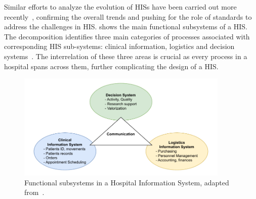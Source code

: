 Similar efforts to analyze the evolution of \acp{HIS} have been carried out more recently~\cite{Balaraman_Kosalram_2013,Degoulet_2014}, confirming the overall trends and pushing for the role of standards to address the challenges in \ac{HIS}.
%
 shows the main functional subsystems of a \ac{HIS}. 
The decomposition identifies three main categories of processes associated with corresponding \ac{HIS} sub-systems: clinical information, logistics and decision systems~\cite{Degoulet_2014}.
%
The interrelation of these three areas is crucial as every process in a hospital spans across them, further complicating the design of a \ac{HIS}.


\begin{figure}[t]
    \centering
    \includegraphics[width=0.9\textwidth]{figures/HIS Schema.pdf} 
    \caption{Functional subsystems in a Hospital Information System, adapted from~\cite{Degoulet_2014}.}
    \label{fig:his-functional}
\end{figure}

